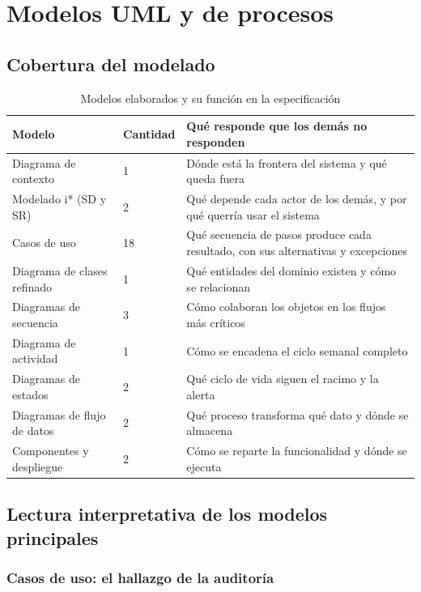 \section{Modelos UML y de procesos}
\label{sec:uml}

\subsection{Cobertura del modelado}

\begin{table}[H]
\centering\footnotesize
\caption{Modelos elaborados y su función en la especificación}
\label{tab:modelos}
\begin{tabular}{|L{4.2cm}|C{1.6cm}|L{8.8cm}|}
\hline
{}\textbf{Modelo} & \textbf{Cantidad} & \textbf{Qué responde que los demás no responden}\\ \hline
Diagrama de contexto & 1 & Dónde está la frontera del sistema y qué queda fuera\\ \hline
Modelado i* (SD y SR) & 2 & Qué depende cada actor de los demás, y por qué querría usar el sistema\\ \hline
Casos de uso & 18 & Qué secuencia de pasos produce cada resultado, con sus alternativas y excepciones\\ \hline
Diagrama de clases refinado & 1 & Qué entidades del dominio existen y cómo se relacionan\\ \hline
Diagramas de secuencia & 3 & Cómo colaboran los objetos en los flujos más críticos\\ \hline
Diagrama de actividad & 1 & Cómo se encadena el ciclo semanal completo\\ \hline
Diagramas de estados & 2 & Qué ciclo de vida siguen el racimo y la alerta\\ \hline
Diagramas de flujo de datos & 2 & Qué proceso transforma qué dato y dónde se almacena\\ \hline
Componentes y despliegue & 2 & Cómo se reparte la funcionalidad y dónde se ejecuta\\ \hline
\end{tabular}
\end{table}

\subsection{Lectura interpretativa de los modelos principales}

\subsubsection*{Casos de uso: el hallazgo de la auditoría}

